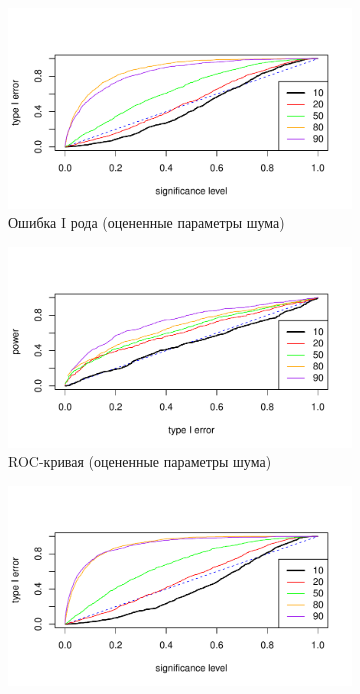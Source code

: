 \documentclass[specialist,
substylefile = spbu_report.rtx,
subf,href,colorlinks=true, 12pt]{disser}
\theoremstyle{definition}
\begin{document}
\begin{figure}[h!]
\begin{subfigure}[t]{0.5\textwidth}
		\includegraphics[width=\textwidth]{img/type1error_trend_est_noise.pdf}
		\caption{Ошибка I рода (оцененные параметры шума)}
		\label{fig:trend_est_noise_type1error}
	\end{subfigure}\hspace{\fill}
	\begin{subfigure}[t]{0.5\textwidth}
		\centering
		\includegraphics[width=\textwidth]{img/roc_trend_est_noise.pdf}
		\caption{ROC-кривая (оцененные параметры шума)}
		\label{fig:trend_est_noise_roc}
	\end{subfigure}
	\begin{subfigure}[t]{0.5\textwidth}
		\centering
		\includegraphics[width=\textwidth]{img/type1error_trend_est_noise_signal.pdf}

\end{subfigure}
\end{figure}
\end{document}
